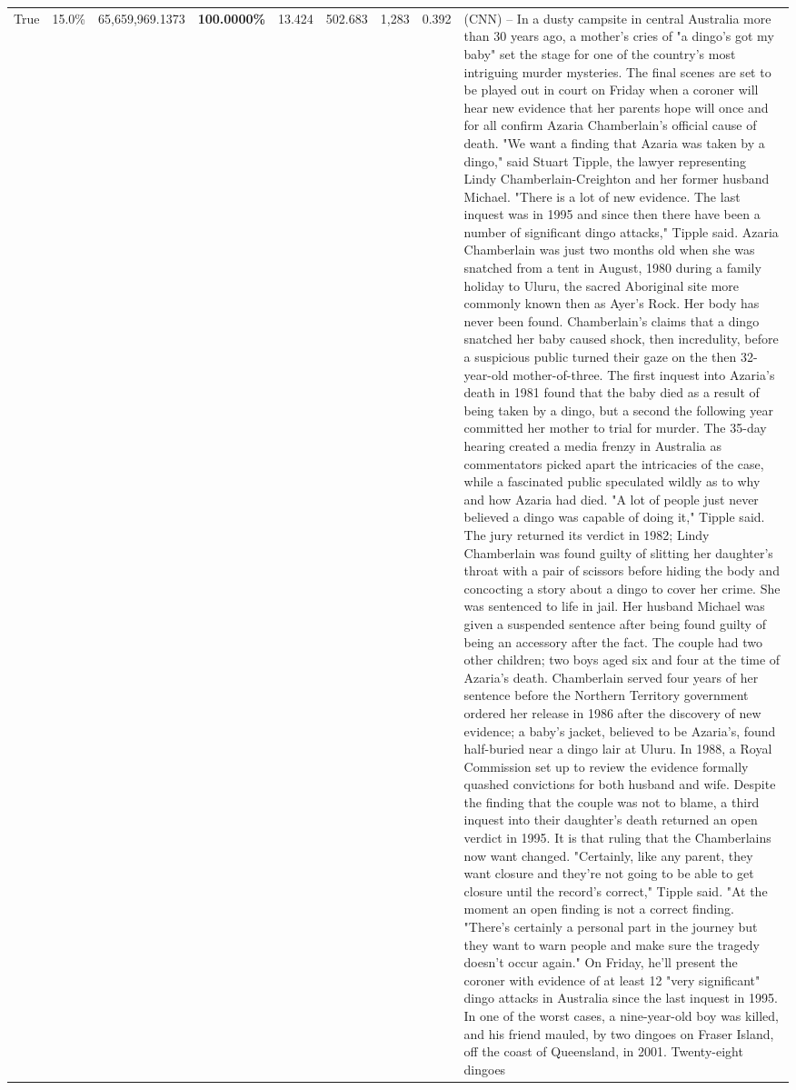 \begin{table}[H]
\begin{tabular}{lllrlllll}
True & 15.0\% & 65,659,969.1373 & \bfseries \color{red} 100.0000\% & 13.424 & 502.683 & 1,283 & 0.392 & (CNN) -- In a dusty campsite in central Australia more than 30 years ago, a mother's cries of "a dingo's got my baby" set the stage for one of the country's most intriguing murder mysteries. The final scenes are set to be played out in court on Friday when a coroner will hear new evidence that her parents hope will once and for all confirm Azaria Chamberlain's official cause of death. "We want a finding that Azaria was taken by a dingo," said Stuart Tipple, the lawyer representing Lindy Chamberlain-Creighton and her former husband Michael. "There is a lot of new evidence. The last inquest was in 1995 and since then there have been a number of significant dingo attacks," Tipple said. Azaria Chamberlain was just two months old when she was snatched from a tent in August, 1980 during a family holiday to Uluru, the sacred Aboriginal site more commonly known then as Ayer's Rock. Her body has never been found. Chamberlain's claims that a dingo snatched her baby caused shock, then incredulity, before a suspicious public turned their gaze on the then 32-year-old mother-of-three. The first inquest into Azaria's death in 1981 found that the baby died as a result of being taken by a dingo, but a second the following year committed her mother to trial for murder. The 35-day hearing created a media frenzy in Australia as commentators picked apart the intricacies of the case, while a fascinated public speculated wildly as to why and how Azaria had died. "A lot of people just never believed a dingo was capable of doing it," Tipple said. The jury returned its verdict in 1982; Lindy Chamberlain was found guilty of slitting her daughter's throat with a pair of scissors before hiding the body and concocting a story about a dingo to cover her crime. She was sentenced to life in jail. Her husband Michael was given a suspended sentence after being found guilty of being an accessory after the fact. The couple had two other children; two boys aged six and four at the time of Azaria's death. Chamberlain served four years of her sentence before the Northern Territory government ordered her release in 1986 after the discovery of new evidence; a baby's jacket, believed to be Azaria's, found half-buried near a dingo lair at Uluru. In 1988, a Royal Commission set up to review the evidence formally quashed convictions for both husband and wife. Despite the finding that the couple was not to blame, a third inquest into their daughter's death returned an open verdict in 1995. It is that ruling that the Chamberlains now want changed. "Certainly, like any parent, they want closure and they're not going to be able to get closure until the record's correct," Tipple said. "At the moment an open finding is not a correct finding. "There's certainly a personal part in the journey but they want to warn people and make sure the tragedy doesn't occur again." On Friday, he'll present the coroner with evidence of at least 12 "very significant" dingo attacks in Australia since the last inquest in 1995. In one of the worst cases, a nine-year-old boy was killed, and his friend mauled, by two dingoes on Fraser Island, off the coast of Queensland, in 2001. Twenty-eight dingoes 
\end{tabular}
\end{table}
